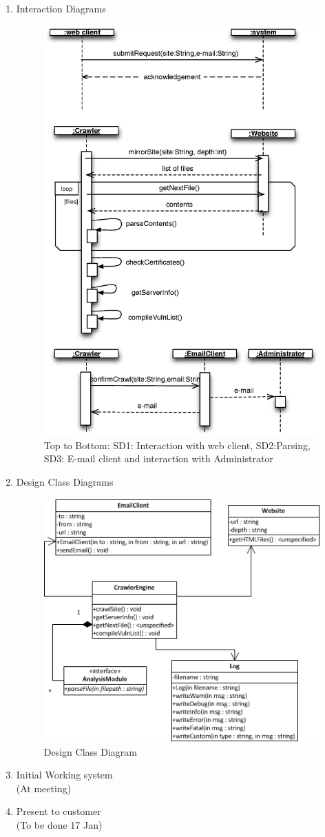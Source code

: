 \documentclass{article}
\begin{document}
\begin{enumerate}
\newpage
\item Interaction Diagrams\\
\begin{figure}[H]
\includegraphics[width=.7\textwidth]{SDs}
\caption{Top to Bottom: SD1: Interaction with web client, SD2:Parsing, SD3: E-mail client and interaction with Administrator}
\end{figure}

\newpage
\item Design Class Diagrams\\
\begin{figure}[H]
\includegraphics{DCD}
\caption{Design Class Diagram}
\end{figure}

\item Initial Working system\\ (At meeting)
\item Present to customer\\ (To be done 17 Jan)

\end{enumerate}
\end{document}
